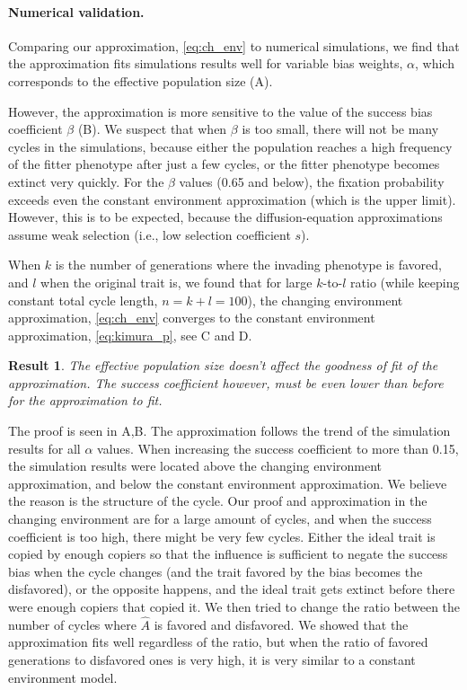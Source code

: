 \documentclass[12pt]{extarticle}
\newtheorem{result}{Result}
\begin{document}
\paragraph{Numerical validation.}
Comparing our approximation, \cref{eq:ch_env} to numerical simulations, we find that the approximation fits simulations results well for variable bias weights, $\alpha$, which corresponds to the effective population size (A).

However, the approximation is more sensitive to the value of the success bias coefficient $\beta$ (B).
We suspect that when $\beta$ is too small, there will not be many cycles in the simulations, because either the population reaches a high frequency of the fitter phenotype after just a few cycles, or the fitter phenotype becomes extinct very quickly. 
For the $\beta$ values (0.65 and below), the fixation probability exceeds even the constant environment approximation (which is the upper limit). However, this is to be expected, because the diffusion-equation approximations assume weak selection (i.e., low selection coefficient $s$).


When $k$ is the number of generations where the invading phenotype is favored, and $l$ when the original trait is, we found that for large $k$-to-$l$ ratio (while keeping constant total cycle length, $n=k+l=100$), the changing environment approximation, \cref{eq:ch_env} converges to the constant environment approximation, \cref{eq:kimura_p}, see C and D.

\begin{result}
The effective population size doesn't affect the goodness of fit of the approximation. The success coefficient however, must be even lower than before for the approximation to fit.
\end{result}
The proof is seen in A,B. The approximation follows the trend of the simulation results for all $\alpha$ values.
When increasing the success coefficient to more than 0.15, the simulation results were located above the changing environment approximation, and below the constant environment approximation. We believe the reason is the structure of the cycle.
Our proof and approximation in the changing environment are for a large amount of cycles, and when the success coefficient is too high, there might be very few cycles. Either the ideal trait is copied by enough copiers so that the influence is sufficient to negate the success bias when the cycle changes (and the trait favored by the bias becomes the disfavored), or the opposite happens, and the ideal trait gets extinct before there were enough copiers that copied it.
We then tried to change the ratio between the number of cycles where $\hat{A}$ is favored and disfavored. We showed that the approximation fits well regardless of the ratio, but when the ratio of favored generations to disfavored ones is very high, it is very similar to a constant environment model.
\end{document}
